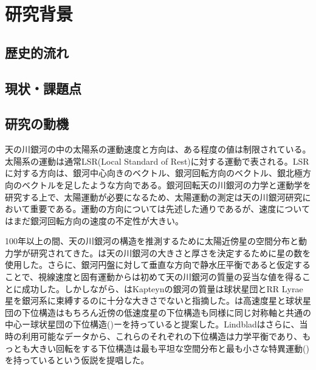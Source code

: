 

\chapter{研究背景}
\section{歴史的流れ}
\section{現状・課題点} %
\section{研究の動機}
天の川銀河の中の太陽系の運動速度と方向は、ある程度の値は制限されている。太陽系の運動は通常LSR(Local Standard of Rest)に対する運動で表される。LSRに対する方向は、銀河中心向きのベクトル、銀河回転方向のベクトル、銀北極方向のベクトルを足したような方向である。銀河回転天の川銀河の力学と運動学を研究する上で、太陽運動が必要になるため、太陽運動の測定は天の川銀河研究において重要である。運動の方向については先述した通りであるが、速度についてはまだ銀河回転方向の速度の不定性が大きい。

100年以上の間、天の川銀河の構造を推測するために太陽近傍星の空間分布と動力学が研究されてきた。\cite{Kapteyn1920}は天の川銀河の大きさと厚さを決定するために星の数を使用した。さらに、銀河円盤に対して垂直な方向で静水圧平衡であると仮定することで、視線速度と固有運動から\cite{Kapteyn1922}は初めて天の川銀河の質量の妥当な値を得ることに成功した。しかしながら、\cite{Oort1927a}はKapteynの銀河の質量は球状星団とRR Lyrae星を銀河系に束縛するのに十分な大きさでないと指摘した。\cite{Lindblad1927}は高速度星と球状星団の下位構造はもちろん近傍の低速度星の下位構造も同様に同じ対称軸と共通の中心ー球状星団の下位構造(\cite{Shapley1918})ーを持っていると提案した。Lindbladはさらに、当時の利用可能なデータから、これらのそれぞれの下位構造は力学平衡であり、もっとも大きい回転をする下位構造は最も平坦な空間分布と最も小さな特異運動(\cite{Jeans1922})を持っているという仮説を提唱した。


